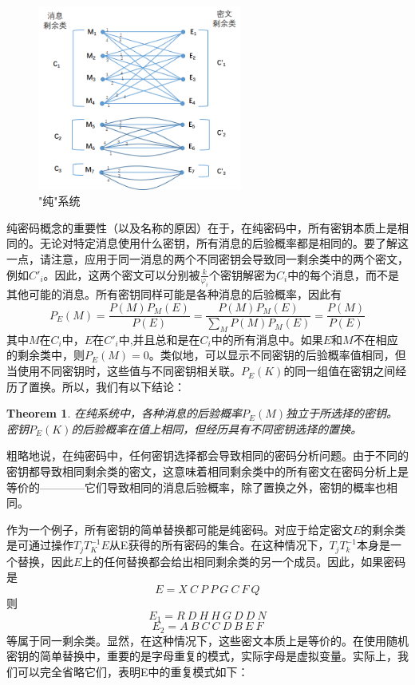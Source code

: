 \documentclass[]{article}
\newtheorem{theorem}{Theorem}
\begin{document}
\begin{figure}[htbp]
	\centering
	\includegraphics[width=0.6\textwidth]{pure-system.png}
	\caption{"纯"系统}
	\label{Fig:fig4}
\end{figure}

纯密码概念的重要性（以及名称的原因）在于，在纯密码中，所有密钥本质上是相同的。无论对特定消息使用什么密钥，所有消息的后验概率都是相同的。要了解这一点，请注意，应用于同一消息的两个不同密钥会导致同一剩余类中的两个密文，例如$C'_i$。因此，这两个密文可以分别被$\frac{k}{\varphi_i}$个密钥解密为$C_i$中的每个消息，而不是其他可能的消息。所有密钥同样可能是各种消息的后验概率，因此有
\[P_E(M)=\frac{P(M)P_M(E)}{P(E)}= \frac{P(M)P_M(E)}{\sum_M P(M)P_M(E)} =  \frac{P(M)}{P(E)}\]
其中$M$在$C_i$中，$E$在$C'_i$中,并且总和是在$C_i$中的所有消息中。如果$E$和$M$不在相应的剩余类中，则$P_E(M)=0$。类似地，可以显示不同密钥的后验概率值相同，但当使用不同密钥时，这些值与不同密钥相关联。$P_E(K)$的同一组值在密钥之间经历了置换。所以，我们有以下结论：

\begin{theorem}
	在纯系统中，各种消息的后验概率$P_E(M)$独立于所选择的密钥。密钥$P_E(K)$的后验概率在值上相同，但经历具有不同密钥选择的置换。
\end{theorem}

粗略地说，在纯密码中，任何密钥选择都会导致相同的密码分析问题。由于不同的密钥都导致相同剩余类的密文，这意味着相同剩余类中的所有密文在密码分析上是等价的————它们导致相同的消息后验概率，除了置换之外，密钥的概率也相同。

作为一个例子，所有密钥的简单替换都可能是纯密码。对应于给定密文$E$的剩余类是可通过操作$T_jT^{-1}_K E$从E获得的所有密码的集合。在这种情况下，$T_jT^{-1}_k$本身是一个替换，因此$E$上的任何替换都会给出相同剩余类的另一个成员。因此，如果密码是
\[E=X\ C\ P\ P\ G\ C\ F\ Q\]
则
\[E_1=R\ D\ H\ H\ G\ D\ D\ N \]
\[E_2=A\ B\ C\ C\ D\ B\ E\ F \]
等属于同一剩余类。显然，在这种情况下，这些密文本质上是等价的。在使用随机密钥的简单替换中，重要的是字母重复的模式，实际字母是虚拟变量。实际上，我们可以完全省略它们，表明E中的重复模式如下：
\end{document}
